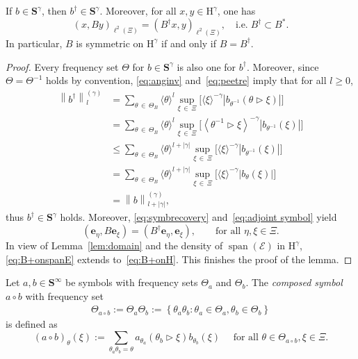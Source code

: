 \documentclass[AHL,Unicode,longabstracts,published]{cedram}
\DeclareMathOperator{\spann}{span}
\renewcommand{\mathsf}{\mathrm}
\newcommand{\sfH}{\mathsf{H}}
\newcommand{\CE}{\mathcal{E}}
\newcommand{\BS}{\mathbf S}
\newcommand{\be}{\mathbf e}
\newcommand{\act}{\triangleright}
\renewcommand{\subseteq}{\subset}
\newcommand{\set}[1]{\left\{ #1 \right\}}
\newcommand{\snorm}[3]{\left\| #1\right\|_{#3}^{(#2)}}
\newcommand{\ang}[1]{\langle #1 \rangle}
\begin{document}
\begin{lemm} \label{lem:adjoint}
If $b\in\BS^\gamma$, then $b^\dagger\in\BS^\gamma$. Moreover, for all $x,y\in\sfH^\gamma$, one has
\begin{equation}\label{eq:B+onH}
(x,By)_{\ell^2(\Xi)}=\left(B^\dagger x,y\right)_{\ell^2(\Xi)}, \quad \text{i.e.}\; B^\dagger\subseteq B^*.
\end{equation}
In particular, $B$ is symmetric on $\sfH^\gamma$ if and only if $B=B^\dagger$.
\end{lemm}

\begin{proof}
Every frequency set $\Theta$ for $b\in\BS^\gamma$ is also one for $b^\dagger$. Moreover, since $\Theta=\Theta^{-1}$ holds by convention, \eqref{eq:anginv} and~\eqref{eq:peetre} imply that for all $l\geq 0$,
\begin{equation*}
\begin{aligned}
\snorm{b^\dagger}{\gamma}{l}&=\sum\limits_{\theta\,\in\,\Theta_B} \ang{\theta}^l\sup\limits_{\xi\,\in\,\Xi}\big[\ang{\xi}^{-\gamma}|b_{\theta^{-1}}(\theta\act\xi)|\big]\\
&=\sum\limits_{\theta\,\in\,\Theta_B}\ang{\theta}^l\sup\limits_{\xi\,\in\,\Xi}\big[\left\langle\theta^{-1}\act\xi\right\rangle^{-\gamma}|b_{\theta^{-1}}(\xi)|\big]\\
&\leq \sum\limits_{\theta\,\in\,\Theta_B}\ang{\theta}^{l+|\gamma|}\sup\limits_{\xi\,\in\,\Xi}\big[\ang{\xi}^{-\gamma}|b_{\theta^{-1}}(\xi)|\big]\\
&=\sum\limits_{\theta\,\in\,\Theta_B}\ang{\theta}^{l+|\gamma|}\sup\limits_{\xi\,\in\,\Xi}\big[\ang{\xi}^{-\gamma}|b_{\theta}(\xi)|\big]\\
&=\snorm{b}{\gamma}{l+|\gamma|},
\end{aligned}
\end{equation*}
thus $b^\dagger\in\BS^\gamma$ holds. Moreover, \eqref{eq:symbrecovery} and~\eqref{eq:adjoint symbol} yield
\begin{equation}\label{eq:B+onspanE}
(\be_\eta,B\be_\xi)=\left(B^\dagger\be_\eta,\be_\xi\right), \qquad \text{for all }\eta,\xi\in\Xi.
\end{equation}
In view of Lemma~\ref{lem:domain} and the density of $\spann(\CE)$ in $\sfH^\gamma$, \eqref{eq:B+onspanE} extends to~\eqref{eq:B+onH}. This finishes the proof of the lemma.
\end{proof}

\begin{defi}
Let $a, b \in \BS^\infty$ be symbols with frequency sets $\Theta_a$ and $\Theta_b$. The \emph{composed symbol} $a \circ b$ with frequency set
\begin{align}\label{eq:frequencysetcomposition}
\Theta_{a\circ b}:=\Theta_a \Theta_b := \set{\theta_a \theta_b :
\theta_a \in \Theta_a, \theta_b \in \Theta_b}
\end{align}
is defined as
\begin{equation}\label{eq:symbolcomposition}
(a \circ b)_\theta(\xi) := \sum_{\theta_a \theta_b = \theta} a_{\theta_a}(\theta_b \act\xi) b_{\theta_b}(\xi) \quad\text{ for all }\theta\in\Theta_{a\circ b}, \xi\in\Xi.
\end{equation}
\end{defi}
\end{document}
